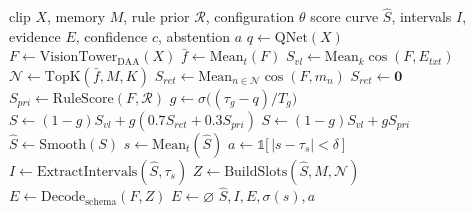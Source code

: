 \begin{algorithm}[!t]
\scriptsize
\setlength{\algorithmicindent}{1em}
\caption{Training and forward procedure of \evivad{}}
\label{alg:evivad}
\begin{algorithmic}[1]
\REQUIRE clip $X$, memory $M$, rule prior $\mathcal{R}$, configuration $\theta$
\ENSURE score curve $\hat{S}$, intervals $I$, evidence $E$, confidence $c$, abstention $a$
\STATE $q \leftarrow \mathrm{QNet}(X)$ 
\STATE $F \leftarrow \mathrm{VisionTower}_{\mathrm{DAA}}(X)$
\STATE $\bar{f} \leftarrow \mathrm{Mean}_t(F)$
\STATE $S_{vl} \leftarrow \mathrm{Mean}_k \cos(F, E_{txt})$
\STATE $\mathcal{N} \leftarrow \mathrm{TopK}(\bar{f}, M, K)$
    \STATE $S_{ret} \leftarrow \mathrm{Mean}_{n \in \mathcal{N}} \cos(F, m_n)$
\ELSE
    \STATE $S_{ret} \leftarrow \mathbf{0}$ 
\ENDIF
\STATE $S_{pri} \leftarrow \mathrm{RuleScore}(F, \mathcal{R})$
\STATE $g \leftarrow \sigma\big((\tau_g - q)/T_g\big)$
    \STATE $S \leftarrow (1-g) S_{vl} + g (0.7 S_{ret} + 0.3 S_{pri})$
\ELSE
    \STATE $S \leftarrow (1-g) S_{vl} + g S_{pri}$
\ENDIF
\STATE $\hat{S} \leftarrow \mathrm{Smooth}(S)$
\STATE $s \leftarrow \mathrm{Mean}_t(\hat{S})$
\STATE $a \leftarrow \mathbb{1}\big[\,|s - \tau_s| < \delta\,\big]$
\STATE $I \leftarrow \mathrm{ExtractIntervals}(\hat{S}, \tau_s)$
\STATE $Z \leftarrow \mathrm{BuildSlots}(\hat{S}, M, \mathcal{N})$
\STATE $E \leftarrow \mathrm{Decode}_{\mathrm{schema}}(F, Z)$
    \STATE $E \leftarrow \varnothing$ 
\ENDIF
\RETURN $\hat{S}, I, E, \sigma(s), a$
\end{algorithmic}
\end{algorithm}
